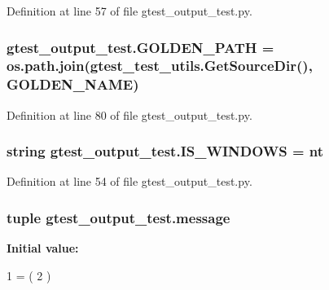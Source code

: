 Definition at line 57 of file gtest\+\_\+output\+\_\+test.\+py.

\subsubsection[{\texorpdfstring{G\+O\+L\+D\+E\+N\+\_\+\+P\+A\+TH}{GOLDEN_PATH}}]{\setlength{\rightskip}{0pt plus 5cm}gtest\+\_\+output\+\_\+test.\+G\+O\+L\+D\+E\+N\+\_\+\+P\+A\+TH = os.\+path.\+join({\bf gtest\+\_\+test\+\_\+utils.\+Get\+Source\+Dir}(), {\bf G\+O\+L\+D\+E\+N\+\_\+\+N\+A\+ME})}\hypertarget{namespacegtest__output__test_aa592d897eeba0ac7e1a3c7d84f182c11}{}\label{namespacegtest__output__test_aa592d897eeba0ac7e1a3c7d84f182c11}


Definition at line 80 of file gtest\+\_\+output\+\_\+test.\+py.

\subsubsection[{\texorpdfstring{I\+S\+\_\+\+W\+I\+N\+D\+O\+WS}{IS_WINDOWS}}]{\setlength{\rightskip}{0pt plus 5cm}string gtest\+\_\+output\+\_\+test.\+I\+S\+\_\+\+W\+I\+N\+D\+O\+WS = \textquotesingle{}nt\textquotesingle{}}\hypertarget{namespacegtest__output__test_a76e823e0e56e3c25aa8b0aab4431f763}{}\label{namespacegtest__output__test_a76e823e0e56e3c25aa8b0aab4431f763}


Definition at line 54 of file gtest\+\_\+output\+\_\+test.\+py.

\subsubsection[{\texorpdfstring{message}{message}}]{\setlength{\rightskip}{0pt plus 5cm}tuple gtest\+\_\+output\+\_\+test.\+message}\hypertarget{namespacegtest__output__test_ac696d0798ad7d08cb2e61070824750e2}{}\label{namespacegtest__output__test_ac696d0798ad7d08cb2e61070824750e2}
{\bfseries Initial value\+:}
\begin{DoxyCode}
1 = (
2           )
\end{DoxyCode}


